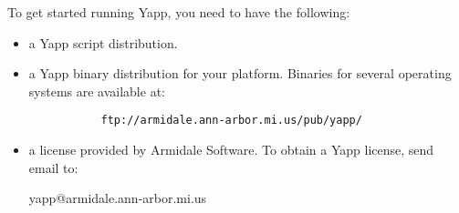 \documentclass[twoside]{report}
\begin{document}
   To get started running Yapp, you need to have the following:
   \begin{itemize}
   \item a Yapp script distribution.
   \item a Yapp binary distribution for your platform.
           Binaries for several operating systems are available at:
           \begin{verbatim}
           ftp://armidale.ann-arbor.mi.us/pub/yapp/
           \end{verbatim}
           \vspace{-12pt}
   
   \item a license provided by Armidale Software.
         To obtain a Yapp license, send email to:

            {\centering yapp@armidale.ann-arbor.mi.us \\}
   \end{itemize}
   
\end{document}
